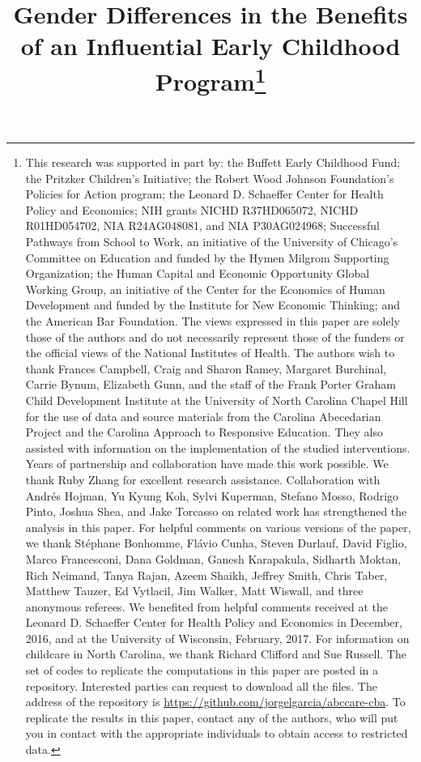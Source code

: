 \begin{titlepage}
\title{\Large \textbf{Gender Differences in the Benefits of an Influential Early Childhood Program}\thanks{This research was supported in part by: the Buffett Early Childhood Fund; the Pritzker Children's Initiative; the Robert Wood Johnson Foundation's Policies for Action program; the Leonard D. Schaeffer Center for Health Policy and Economics; NIH grants NICHD R37HD065072, NICHD R01HD054702, NIA R24AG048081, and NIA P30AG024968; Successful Pathways from School to Work, an initiative of the University of Chicago's Committee on Education and funded by the Hymen Milgrom Supporting Organization; the Human Capital and Economic Opportunity Global Working Group, an initiative of the Center for the Economics of Human Development and funded by the Institute for New Economic Thinking; and the American Bar Foundation. The views expressed in this paper are solely those of the authors and do not necessarily represent those of the funders or the official views of the National Institutes of Health. The authors wish to thank Frances Campbell, Craig and Sharon Ramey, Margaret Burchinal, Carrie Bynum, Elizabeth Gunn, and the staff of the Frank Porter Graham Child Development Institute at the University of North Carolina Chapel Hill for the use of data and source materials from the Carolina Abecedarian Project and the Carolina Approach to Responsive Education. They also assisted with information on the implementation of the studied interventions. Years of partnership and collaboration have made this work possible. We thank Ruby Zhang for excellent research assistance. Collaboration with Andr\'{e}s Hojman, Yu Kyung Koh, Sylvi Kuperman, Stefano Mosso, Rodrigo Pinto, Joshua Shea, and Jake Torcasso on related work has strengthened the analysis in this paper. For helpful comments on various versions of the paper, we thank St\'{e}phane Bonhomme, Fl\'{a}vio Cunha, Steven Durlauf, David Figlio, Marco Francesconi, Dana Goldman, Ganesh Karapakula, Sidharth Moktan, Rich Neimand, Tanya Rajan, Azeem Shaikh, Jeffrey Smith, Chris Taber, Matthew Tauzer, Ed Vytlacil, Jim Walker, Matt Wiswall, and three anonymous referees. We benefited from helpful comments received at the Leonard D. Schaeffer Center for Health Policy and Economics in December, 2016, and at the University of Wisconsin, February, 2017. For information on childcare in North Carolina, we thank Richard Clifford and Sue Russell. The set of codes to replicate the computations in this paper are posted in a repository. Interested parties can request to download all the files. The address of the repository is \url{https://github.com/jorgelgarcia/abccare-cba}. To replicate the results in this paper, contact any of the authors, who will put you in contact with the appropriate individuals to obtain access to restricted data.}}


\end{titlepage}
